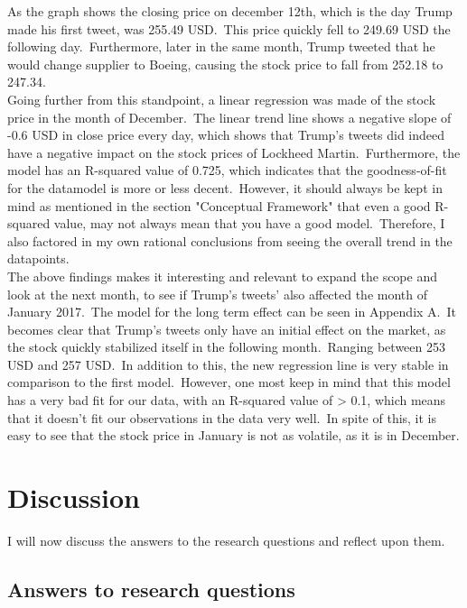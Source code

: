 \documentclass[12pt]{article}
\begin{document}
As the graph shows the closing price on december 12th, which is the day Trump made his first tweet, was 255.49 USD.\ This price quickly fell to 249.69 USD the following day.\ Furthermore, later in the same month, Trump tweeted that he would change supplier to Boeing, causing the stock price to fall from 252.18 to 247.34. \\

Going further from this standpoint,  a linear regression was made of the stock price in the month of December.\ The linear trend line shows a negative slope of -0.6 USD in close price every day, which shows that Trump's tweets did indeed have a negative impact on the stock prices of Lockheed Martin.\ Furthermore, the model has an R-squared value of 0.725, which indicates that the goodness-of-fit for the datamodel is more or less decent.\ However, it should always be kept in mind as mentioned in the section "Conceptual Framework" that even a good R-squared value, may not always mean that you have a good model.\ Therefore, I also factored in my own rational conclusions from seeing the overall trend in the datapoints.\\

The above findings makes it interesting and relevant to expand the scope and look at the next month, to see if Trump's tweets' also affected the month of January 2017.\ The model for the long term effect can be seen in Appendix A.\ It becomes clear that Trump's tweets only have an initial effect on the market, as the stock quickly stabilized itself in the following month.\ Ranging between 253 USD and 257 USD.\ In addition to this, the new regression line is very stable in comparison to the first model.\ However, one most keep in mind that this model has a very bad fit for our data, with an R-squared value of > 0.1, which means that it doesn't fit our observations in the data very well.\ In spite of this, it is easy to see that the stock price in January is not as volatile, as it is in December.


\section{Discussion}
I will now discuss the answers to the research questions and reflect upon them. 

\subsection{Answers to research questions}
\end{document}
